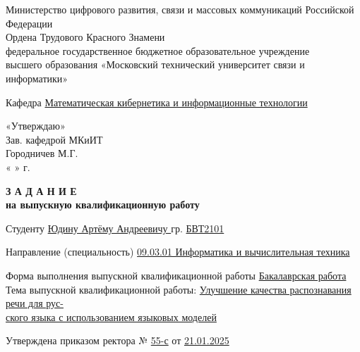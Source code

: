
{
\newpage
\fontsize{12pt}{12pt}\selectfont
\begin{center}
    \noindent Министерство цифрового развития, связи и массовых коммуникаций Российской Федерации\\Ордена Трудового Красного Знамени \\ 
федеральное государственное бюджетное образовательное учреждение\\
высшего образования 
«Московский технический университет связи и информатики»
\end{center}
\noindent Кафедра \underline{Математическая кибернетика и информационные технологии} \hfill
\vspace{0.1cm}
\noindent
\begin{minipage}[t]{6cm}
«Утверждаю»\\
Зав. кафедрой  МКиИТ \\
Городничев М.Г.\\
« \hrulefill »  г.
\end{minipage}

\vspace{0.5cm}

\begin{center}
\textbf{З А Д А Н И Е}\\
\textbf{на выпускную квалификационную работу}
\end{center}

\vspace{0.3cm}

\noindent Студенту \underline{Юдину Артёму Андреевичу \hfill } гр. \underline{БВТ2101}

\vspace{0.2cm}

\noindent Направление (специальность) \underline{09.03.01 Информатика и вычислительная техника}

\vspace{0.2cm}

\noindent Форма выполнения выпускной квалификационной работы \underline{Бакалаврская работа} \\
Тема выпускной квалификационной работы: \underline{Улучшение качества распознавания речи для рус-}\\\underline{ского языка с использованием языковых моделей}


\noindent Утверждена приказом ректора № \underline{55-с} \hfill от \underline{21.01.2025}

\vspace{0.2cm}

}
